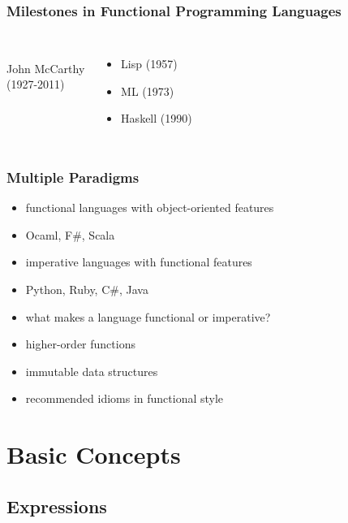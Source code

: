 \documentclass[dvipsnames]{beamer}
\theoremstyle{plain}
\begin{document}
\begin{frame}
  \frametitle{Milestones in Functional Programming Languages}

  \begin{columns}
    \begin{center}
      \\
      John McCarthy\\
      (1927-2011)
    \end{center}

    \begin{itemize}
      \item Lisp (1957)
      \item ML (1973)
      \item Haskell (1990)
    \end{itemize}
  \end{columns}
\end{frame}

\begin{frame}
  \frametitle{Multiple Paradigms}

  \begin{itemize}
    \item functional languages with object-oriented features
    \item Ocaml, F\#, Scala

    \medskip
    \item imperative languages with functional features
    \item Python, Ruby, C\#, Java

    \pause
    \bigskip
    \item what makes a language functional or imperative?
    \smallskip
    \item higher-order functions
    \item immutable data structures
    \item recommended idioms in functional style
  \end{itemize}
\end{frame}

\section{Basic Concepts}

\lstset{language=Haskell}

\subsection{Expressions}
\end{document}
